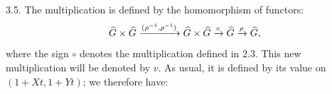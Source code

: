 3.5. The multiplication is defined by the homomorphism of functors:
\[
  \widehat G\times\widehat G\xrightarrow{(\rho^{-1},\rho^{-1})}
  \widehat G\times\widehat G\xrightarrow{\circ}\widehat G\xrightarrow{\rho}\widehat G ,
\]
where the sign \(\circ\) denotes the multiplication defined in 2.3. This new multiplication will be denoted by \(v\). As usual, it is defined by its value on \((1+Xt,1+Yt)\); we therefore have:
